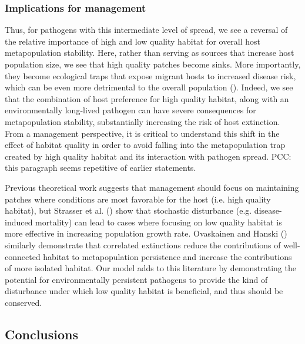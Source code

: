\documentclass{article}
\begin{document}
\subsubsection*{Implications for management}

Thus, for pathogens with this intermediate level of spread, we see a reversal of the relative importance of high and low quality habitat for overall host metapopulation stability.
Here, rather than serving as sources that increase host population size, we see that high quality patches become sinks.  
More importantly, they become ecological traps that expose migrant hosts to increased disease risk, which can be even more detrimental to the overall population (\cite{Kristan2003}).  
Indeed, we see that the combination of host preference for high quality habitat, along with an environmentally long-lived pathogen can have severe consequences for metapopulation stability, substantially increasing the risk of host extinction.
From a management perspective, it is critical to understand this shift in the effect of habitat quality in order to avoid falling into the metapopulation trap created by high quality habitat and its interaction with pathogen spread.
PCC: this paragraph seems repetitive of earlier statements. 

Previous theoretical work suggests that management should focus on maintaining patches where conditions are most favorable for the host (i.e. high quality habitat), but Strasser et al. (\cite{Strasser2010}) show that stochastic disturbance (e.g. disease-induced mortality) can lead to cases where focusing on low quality habitat is more effective in increasing population growth rate.
Ovaskainen and Hanski (\cite{Ovaskainen2003a}) similarly demonstrate that correlated extinctions reduce the contributions of well-connected habitat to metapopulation persistence and increase the contributions of more isolated habitat.
Our model adds to this literature by demonstrating the potential for environmentally persistent pathogens to provide the kind of disturbance under which low quality habitat is beneficial, and thus should be conserved.

\subsection*{Conclusions}  
\end{document}
